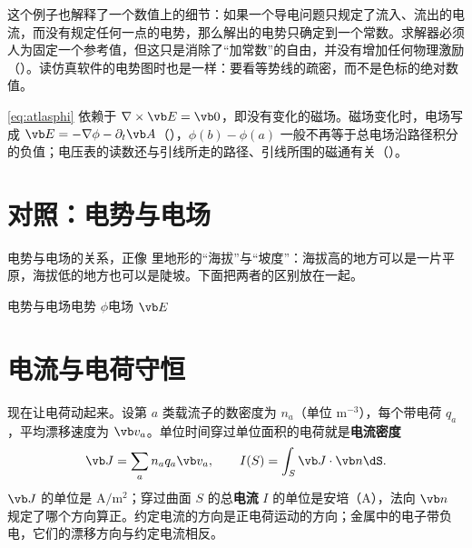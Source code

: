 这个例子也解释了一个数值上的细节：如果一个导电问题只规定了流入、流出的电流，而没有规定任何一点的电势，那么解出的电势只确定到一个常数。求解器必须人为固定一个参考值，但这只是消除了“加常数”的自由，并没有增加任何物理激励（）。读仿真软件的电势图时也是一样：要看等势线的疏密，而不是色标的绝对数值。

\begin{pitfall}
\eqref{eq:atlasphi} 依赖于 $\nabla\times\vb E=\vb 0$，即没有变化的磁场。磁场变化时，电场写成 $\vb E=-\nabla\phi-\partial_t\vb A$（），$\phi(b)-\phi(a)$ 一般不再等于总电场沿路径积分的负值；电压表的读数还与引线所走的路径、引线所围的磁通有关（）。
\end{pitfall}

\section{对照：电势与电场}\label{sec:electric-compare-phiE}

电势与电场的关系，正像 里地形的“海拔”与“坡度”：海拔高的地方可以是一片平原，海拔低的地方也可以是陡坡。下面把两者的区别放在一起。

\begin{compare}{电势与电场}{电势 $\phi$}{电场 $\vb E$}
\end{compare}

\section{电流与电荷守恒}\label{sec:electric-current}

现在让电荷动起来。设第 $a$ 类载流子的数密度为 $n_a$（单位 $\mathrm m^{-3}$），每个带电荷 $q_a$，平均漂移速度为 $\vb v_a$。单位时间穿过单位面积的电荷就是\textbf{电流密度}
\begin{equation}
\vb J=\sum_an_aq_a\vb v_a,
\qquad
I(S)=\int_S\vb J\cdot\vb n\dS .
\label{eq:electric-carriers}
\end{equation}
$\vb J$ 的单位是 $\mathrm{A/m^2}$；穿过曲面 $S$ 的总\textbf{电流} $I$ 的单位是安培（A），法向 $\vb n$ 规定了哪个方向算正。约定电流的方向是正电荷运动的方向；金属中的电子带负电，它们的漂移方向与约定电流相反。

